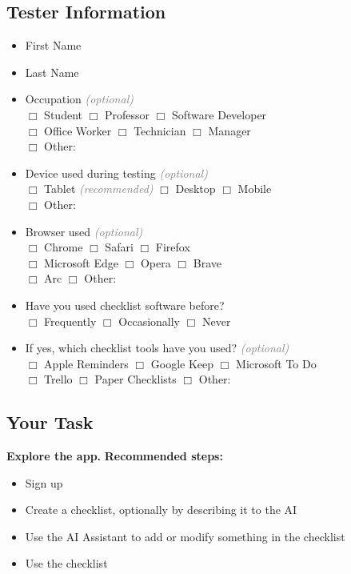 \documentclass[11pt]{article}
\newcommand{\fillline}[1]{\makebox[#1][l]{\hrulefill}}
\newcommand{\formnote}[1]{\textit{\textcolor{gray}{(#1)}}}
\begin{document}
\subsection*{Tester Information}

\begin{itemize}[leftmargin=1.4em,itemsep=0.4em,label={}]
  \item First Name\hfill \fillline{7cm}
  \item Last Name\hfill \fillline{7cm}
  \item Occupation \formnote{optional}\\
  $\Box$ Student \qquad $\Box$ Professor \qquad $\Box$ Software Developer\\
  $\Box$ Office Worker \qquad $\Box$ Technician \qquad $\Box$ Manager\\
  $\Box$ Other: \fillline{5cm}
  \item Device used during testing \formnote{optional}\\
  $\Box$ Tablet \formnote{recommended} \qquad $\Box$ Desktop \qquad $\Box$ Mobile\\
  $\Box$ Other: \fillline{5cm}
  \item Browser used \formnote{optional}\\
  $\Box$ Chrome \qquad $\Box$ Safari \qquad $\Box$ Firefox\\
  $\Box$ Microsoft Edge \qquad $\Box$ Opera \qquad $\Box$ Brave\\
  $\Box$ Arc \qquad $\Box$ Other: \fillline{5cm}
  \item Have you used checklist software before?\\
  $\Box$ Frequently \qquad $\Box$ Occasionally \qquad $\Box$ Never
  \item If yes, which checklist tools have you used? \formnote{optional}\\
  $\Box$ Apple Reminders \qquad $\Box$ Google Keep \qquad $\Box$ Microsoft To Do\\
  $\Box$ Trello \qquad $\Box$ Paper Checklists \qquad $\Box$ Other: \fillline{5cm}
\end{itemize}

\subsection*{Your Task}

\textbf{Explore the app.} \textbf{Recommended steps:}

\begin{itemize}[leftmargin=1.4em,itemsep=0.25em]
  \item Sign up
  \item Create a checklist, optionally by describing it to the AI
  \item Use the AI Assistant to add or modify something in the checklist
  \item Use the checklist
\end{itemize}
\end{document}
